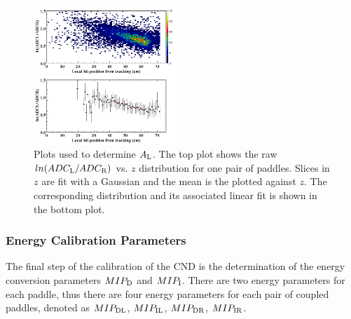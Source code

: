 \begin{figure}[htb]
\begin{center}
\includegraphics[width=0.48\textwidth]{Figure/attl1.png} 
\end{center}
\caption{Plots used to determine $A_{\rm{L}}$. The top plot shows the raw $ln(ADC_{\rm{L}}/ADC_{\rm{R}})$ vs. $z$ distribution for one pair of paddles. Slices in $z$ are fit with a Gaussian and the mean is the plotted against $z$. The corresponding distribution and its associated linear fit is shown in the bottom plot.}
\label{attl}
\end{figure}

\subsubsection{Energy Calibration Parameters}\label{sec_energy_cal}

The final step of the calibration of the CND is the determination of the energy conversion parameters $MIP_{\rm{D}}$ and $MIP_{\rm{I}}$. There are two energy parameters for each paddle, thus there are four energy parameters for each pair of coupled paddles, denoted as $MIP_{\rm{DL}}$, $MIP_{\rm{IL}}$, $MIP_{\rm{DR}}$, $MIP_{\rm{IR}}$.

